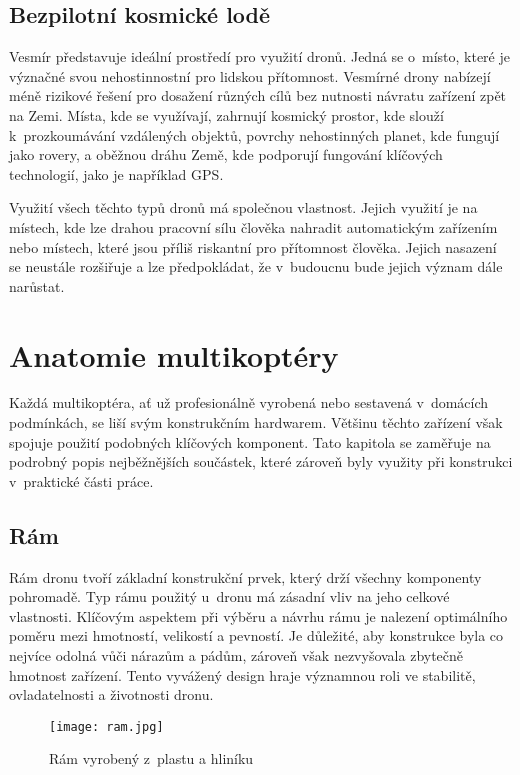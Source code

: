 \documentclass[12pt]{report}
\begin{document}
\section[Bezpilotní kosmické lodě]{Bezpilotní kosmické lodě}
Vesmír představuje ideální prostředí pro využití dronů. Jedná se o~místo, které je význačné svou nehostinnostní pro lidskou přítomnost. Vesmírné drony nabízejí méně rizikové řešení pro dosažení různých cílů bez nutnosti návratu zařízení zpět na Zemi. Místa, kde se využívají, zahrnují kosmický prostor, kde slouží k~prozkoumávání vzdálených objektů, povrchy nehostinných planet, kde fungují jako rovery, a oběžnou dráhu Země, kde podporují fungování klíčových technologií, jako je například GPS. \cite{mainbook}

Využití všech těchto typů dronů má společnou vlastnost. Jejich využití je na místech, kde lze drahou pracovní sílu člověka nahradit automatickým zařízením nebo místech, které jsou příliš riskantní pro přítomnost člověka. Jejich nasazení se neustále rozšiřuje a lze předpokládat, že v~budoucnu bude jejich význam dále narůstat.

\chapter[Anatomie multikoptéry]{Anatomie multikoptéry}
Každá multikoptéra, ať už profesionálně vyrobená nebo sestavená v~domácích podmínkách, se liší svým konstrukčním hardwarem. Většinu těchto zařízení však spojuje použití podobných klíčových komponent. Tato kapitola se zaměřuje na podrobný popis nejběžnějších součástek, které zároveň byly využity při konstrukci v~praktické části práce.

\section[Rám]{Rám}
Rám dronu tvoří základní konstrukční prvek, který drží všechny komponenty pohromadě. Typ rámu použitý u~dronu má zásadní vliv na jeho celkové vlastnosti. Klíčovým aspektem při výběru a návrhu rámu je nalezení optimálního poměru mezi hmotností, velikostí a pevností. Je důležité, aby konstrukce byla co nejvíce odolná vůči nárazům a pádům, zároveň však nezvyšovala zbytečně hmotnost zařízení. Tento vyvážený design hraje významnou roli ve stabilitě, ovladatelnosti a životnosti dronu.

\begin{figure}[H]
	\centering
	\texttt{[image: ram.jpg]}
	\caption{Rám vyrobený z~plastu a hliníku \cite{mainbook}}
	\label{fig:ram.jpg}
  \end{figure}
\end{document}
